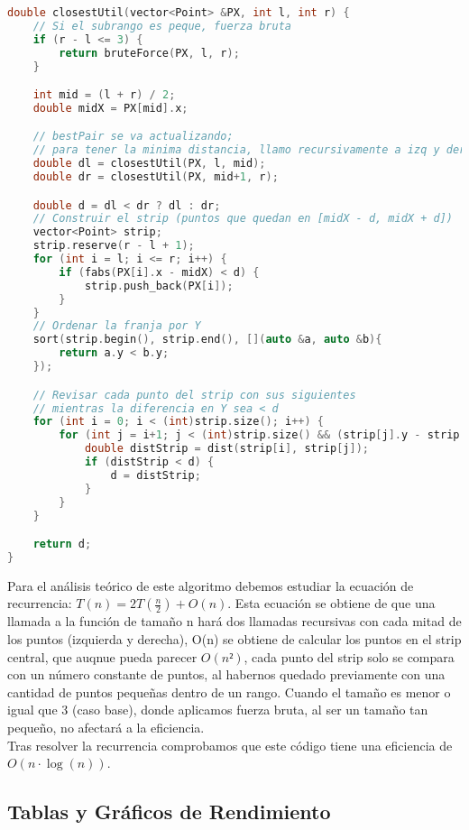 \documentclass[a4paper,12pt]{article}
\begin{document}
\begin{lstlisting}[language=C++, caption={Divide y vencerás de \textbf{``El par de puntos más cercano''}}]
double closestUtil(vector<Point> &PX, int l, int r) {
	// Si el subrango es peque, fuerza bruta
	if (r - l <= 3) {
		return bruteForce(PX, l, r);
	}

	int mid = (l + r) / 2;
	double midX = PX[mid].x;

	// bestPair se va actualizando; 
	// para tener la minima distancia, llamo recursivamente a izq y der
	double dl = closestUtil(PX, l, mid);
	double dr = closestUtil(PX, mid+1, r);

	double d = dl < dr ? dl : dr;
	// Construir el strip (puntos que quedan en [midX - d, midX + d])
	vector<Point> strip;
	strip.reserve(r - l + 1);
	for (int i = l; i <= r; i++) {
		if (fabs(PX[i].x - midX) < d) {
			strip.push_back(PX[i]);
		}
	}
	// Ordenar la franja por Y
	sort(strip.begin(), strip.end(), [](auto &a, auto &b){
		return a.y < b.y;
	});

	// Revisar cada punto del strip con sus siguientes
	// mientras la diferencia en Y sea < d
	for (int i = 0; i < (int)strip.size(); i++) {
		for (int j = i+1; j < (int)strip.size() && (strip[j].y - strip[i].y) < d; j++) {
			double distStrip = dist(strip[i], strip[j]);
			if (distStrip < d) {
				d = distStrip;
			}
		}
	}

	return d;
}
\end{lstlisting}

Para el análisis teórico de este algoritmo debemos estudiar la ecuación de recurrencia: $T(n) = 2T(\frac{n}{2}) + O(n)$.
Esta ecuación se obtiene de que una llamada a la función de tamaño n hará dos llamadas recursivas con cada mitad de los puntos (izquierda y derecha),
O(n) se obtiene de calcular los puntos en el strip central, que auqnue pueda parecer $O(n²)$, cada punto del strip solo 
se compara con un número constante de puntos, al habernos quedado previamente con una cantidad de puntos pequeñas dentro de un rango.
Cuando el tamaño es menor o igual que 3 (caso base), donde aplicamos 
fuerza bruta, al ser un tamaño tan pequeño, no afectará a la eficiencia.\\


Tras resolver la recurrencia comprobamos que este código tiene una eficiencia de $O(n\cdot \log (n))$.\\

\subsection{Tablas y Gráficos de Rendimiento}
\end{document}
